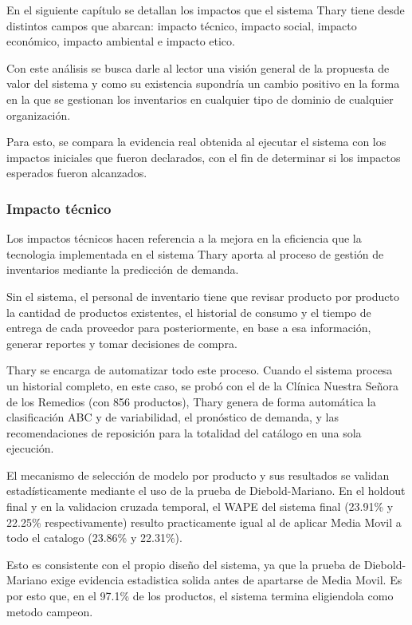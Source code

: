 En el siguiente capítulo se detallan los impactos que el sistema Thary tiene desde distintos campos que abarcan: impacto técnico, impacto social, impacto económico, impacto ambiental e impacto etico.

Con este análisis se busca darle al lector una visión general de la propuesta de valor del sistema y como su existencia supondría un cambio positivo en la forma en la que se gestionan los inventarios en cualquier tipo de dominio de cualquier organización.

Para esto, se compara la evidencia real obtenida al ejecutar el sistema con los impactos iniciales que fueron declarados, con el fin de determinar si los impactos esperados fueron alcanzados.

\subsubsection{Impacto técnico}
Los impactos técnicos hacen referencia a la mejora en la eficiencia que la tecnologia implementada en el sistema Thary aporta al proceso de gestión de inventarios mediante la predicción de demanda.

Sin el sistema, el personal de inventario tiene que revisar producto por producto la cantidad de productos existentes, el historial de consumo y el tiempo de entrega de cada proveedor para posteriormente, en base a esa información, generar reportes y tomar decisiones de compra.

Thary se encarga de automatizar todo este proceso. Cuando el sistema procesa un historial completo, en este caso, se probó con el de la Clínica Nuestra Señora de los Remedios (con 856 productos), Thary genera de forma automática la clasificación ABC y de variabilidad, el pronóstico de demanda, y las recomendaciones de reposición para la totalidad del catálogo en una sola ejecución.

El mecanismo de selección de modelo por producto y sus resultados se validan estadísticamente mediante el uso de la prueba de Diebold-Mariano. En el holdout final y en la validacion cruzada temporal, el WAPE del sistema final (23.91\% y 22.25\% respectivamente) resulto practicamente igual al de aplicar Media Movil a todo el catalogo (23.86\% y 22.31\%).

Esto es consistente con el propio diseño del sistema, ya que la prueba de Diebold-Mariano exige evidencia estadistica solida antes de apartarse de Media Movil. Es por esto que, en el 97.1\% de los productos, el sistema termina eligiendola como metodo campeon.

